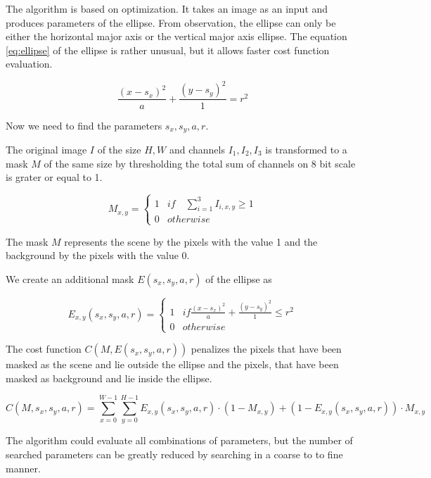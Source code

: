 \documentclass[a4paper,12pt,titlepage, twoside]{article}
\numberwithin{figure}{section}
\begin{document}
The algorithm is based on optimization. It takes an image as an input and produces parameters of the ellipse. From observation, the ellipse can only be either the horizontal major axis or the vertical major axis ellipse. The equation \ref{eq:ellipse} of the ellipse is rather unusual, but it allows faster cost function evaluation.

\begin{equation}
\label{eq:ellipse}
\frac{(x-s_x)^2}{a} + \frac{(y-s_y)^2}{1} = r^2
\end{equation}

Now we need to find the parameters $s_x, s_y, a, r$.

The original image $I$ of the size $H, W$ and channels $I_1, I_2, I_3$ is transformed to a mask $M$ of the same size by thresholding the total sum of channels on 8 bit scale is grater or equal to 1. \cite{lukacs1997real}

\begin{equation*}
M_{x,y} = \begin{cases}
1 & if \quad \sum_{i=1}^{3} I_{i,x,y} \geq 1 \\
0 & otherwise
\end{cases}
\end{equation*}

The mask $M$ represents the scene by the pixels with the value 1 and the background by the pixels with the value 0. 

We create an additional mask $E(s_x, s_y, a, r)$ of the ellipse as 

\begin{equation*}
E_{x,y}(s_x, s_y, a, r) = \begin{cases}
1 & if \frac{(x-s_x)^2}{a} + \frac{(y-s_y)^2}{1} \leq r^2 \\
0 & otherwise
\end{cases}
\end{equation*}

The cost function $C(M, E(s_x, s_y, a, r))$ penalizes the pixels that have been masked as the scene and lie outside the ellipse and the pixels, that have been masked as background and lie inside the ellipse.

\begin{equation}
C(M, s_x, s_y, a, r) = \sum_{x = 0}^{W-1} \sum_{y = 0}^{H-1} E_{x,y}(s_x, s_y, a, r) \cdot (1-M_{x,y}) + (1 - E_{x,y}(s_x, s_y, a, r)) \cdot M_{x,y}
\end{equation}

The algorithm could evaluate all combinations of parameters, but the number of searched parameters can be greatly reduced by searching in a coarse to to fine manner. 
\end{document}
